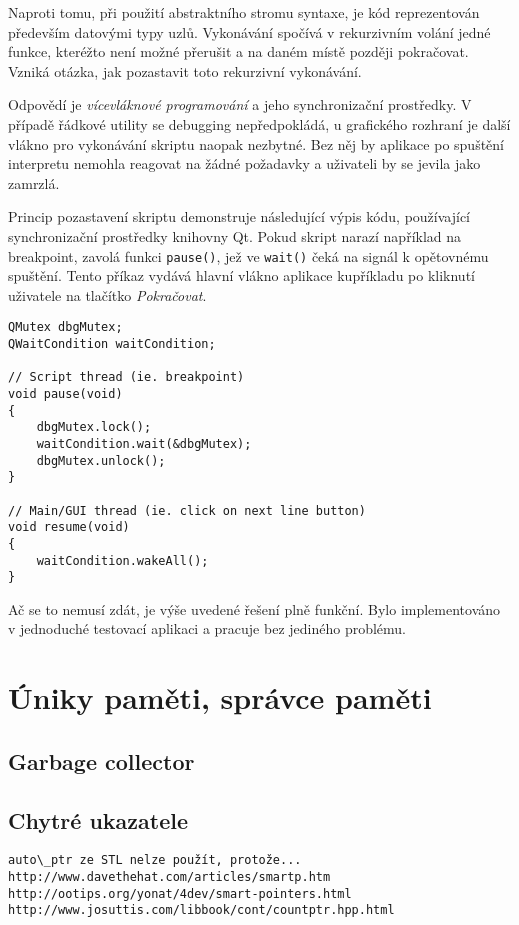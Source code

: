 \documentclass[11pt,twoside,a4paper]{book}
\begin{document}
Naproti tomu, při použití abstraktního stromu syntaxe, je kód reprezentován především datovými typy uzlů. Vykonávání spočívá v rekurzivním volání jedné funkce, kteréžto není možné přerušit a na daném místě později pokračovat. Vzniká otázka, jak pozastavit toto rekurzivní vykonávání.

Odpovědí je \textit{vícevláknové programování} a jeho synchronizační prostředky. V případě řádkové utility se debugging nepředpokládá, u grafického rozhraní je další vlákno pro vykonávání skriptu naopak nezbytné. Bez něj by aplikace po spuštění interpretu nemohla reagovat na žádné požadavky a uživateli by se jevila jako zamrzlá.

Princip pozastavení skriptu demonstruje následující výpis kódu, používající synchronizační prostředky knihovny Qt. Pokud skript narazí například na breakpoint, zavolá funkci \texttt{pause()}, jež ve \texttt{wait()} čeká na signál k opětovnému spuštění. Tento příkaz vydává hlavní vlákno aplikace kupříkladu po kliknutí uživatele na tlačítko \textit{Pokračovat}.

\begin{verbatim}
QMutex dbgMutex;
QWaitCondition waitCondition;

// Script thread (ie. breakpoint)
void pause(void)
{
    dbgMutex.lock();
    waitCondition.wait(&dbgMutex);
    dbgMutex.unlock();
}

// Main/GUI thread (ie. click on next line button)
void resume(void)
{
    waitCondition.wakeAll();
}
\end{verbatim}

Ač se to nemusí zdát, je výše uvedené řešení plně funkční. Bylo implementováno v jednoduché testovací aplikaci a pracuje bez jediného problému.


\section{Úniky paměti, správce paměti}

\subsection{Garbage collector}

\subsection{Chytré ukazatele}

\begin{verbatim}
auto\_ptr ze STL nelze použít, protože...
http://www.davethehat.com/articles/smartp.htm
http://ootips.org/yonat/4dev/smart-pointers.html
http://www.josuttis.com/libbook/cont/countptr.hpp.html
\end{verbatim}
\end{document}
